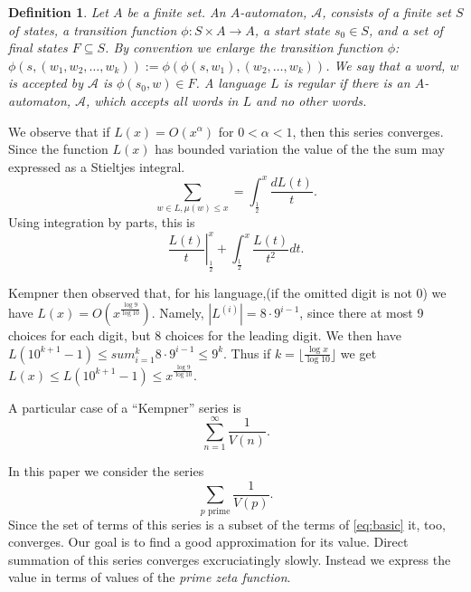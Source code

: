 \documentclass{article}
\newtheorem{definition}[section]{Definition}
\begin{document}
\begin{definition}
  Let $A$ be a finite set. An $A$-automaton, $\mathcal{A}$, consists of a finite set
  $S$ of \emph{states}, a \emph{transition function} $\phi: S \times A
  \rightarrow A$, a \emph{start state} $s_0 \in S$, and a set of
  \emph{final states} $F \subseteq S$. By convention we enlarge the
  transition function $\phi$:
  $\phi(s,(w_1,w_2,\dots,w_k)) := \phi(\phi(s,w_1), (w_2,\dots,
  w_k))$.
  We say that a word, $w$ is accepted by $\mathcal{A}$ is $\phi(s_0,
  w) \in F$.
  A language $L$ is \emph{regular} if there is an $A$-automaton,
  $\mathcal{A}$, which accepts all words in $L$ and no other words.
\end{definition}
We observe that if $L(x) = O(x^\alpha)$ for $0 < \alpha < 1$, then
this series converges. Since the function $L(x)$ has bounded variation
the value of the the sum may expressed as a Stieltjes integral.
\begin{equation}
  \label{eq:stieltjes}
  \sum_{w \in L, \mu(w) \le x} = \int_{\frac{1}{2}}^x\frac{d L(t)}{t}.
\end{equation}
Using integration by parts, this is
\begin{equation}
  \label{eq:parts}
  \left. \frac{L(t)}{t} \right|_{\frac{1}{2}}^x + \int_{\frac{1}{2}}^x
  \frac{L(t)}{t^2} dt.
\end{equation}

Kempner then observed that, for his language,(if the omitted digit is
not 0) we have $L(x) =
O(x^{\frac{\log 9}{\log 10}})$. Namely, $|L^{(i)}| = 8\cdot 9^{i-1}$, since
there at most 9 choices for each digit, but 8 choices for the leading
digit. We then have $L(10^{k+1}-1) \le
sum_{i=1}^k 8\cdot 9^{i-1} \le 9^k.$ Thus if $k=\lfloor
\frac{\log x}{\log 10} \rfloor$ we get $L(x) \le L(10^{k+1}-1) \le
x^{\frac{\log 9}{\log {10}}}$.

A particular case of a ``Kempner'' series is
\begin{displaymath}
  \sum_{n=1}^\infty \frac{1}{V(n)}.
\end{displaymath}
 
In this paper we consider the series
\begin{equation}
  \label{eq:main:series}
  \sum_{p \text{ prime}} \frac{1}{V(p)}.
\end{equation}
Since the set of terms of this series is a subset of the terms of
\eqref{eq:basic} it, too, converges. Our goal is to find a good
approximation for its value. Direct summation of this series converges
excruciatingly slowly. Instead we express the value in terms of values
of the \emph{prime zeta function}.
\end{document}
